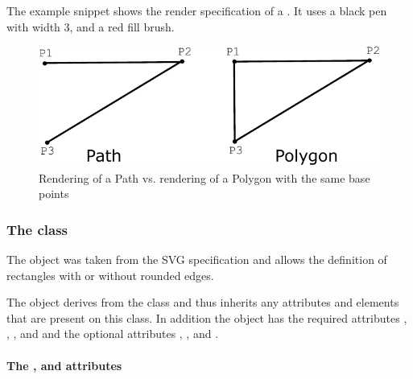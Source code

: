 The example snippet shows the render specification of a \Polygon. It uses a 
black pen with width 3, and a red fill brush.

{\footnotesize
{}
}

\begin{figure}[!ht]
\begin{center}
\includegraphics[scale=0.10]{figures/PathVsPolygon}
\end{center}
\caption{Rendering of a Path vs. rendering of a Polygon with the same base points}
\label{PathVsPolygon}
\end{figure}



\subsubsection{The  class}
\label{renderrectangle-class}

The \RenderRectangle object was taken from the SVG specification and allows the 
definition of 
rectangles with or without rounded edges. 

The \RenderRectangle object derives from the \GraphicalPrimitiveTwoD
class and thus inherits any attributes and elements that are present on
this class.
In addition the \RenderRectangle object has the required attributes , 
, , and  and the optional attributes 
, ,  and .

\paragraph{The \fixttspace{}, \fixttspace{} and \fixttspace{}  attributes}


